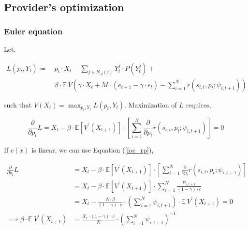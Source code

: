 \documentclass[american]{scrartcl}
\newcommand{\E}{\mathbb{E}}
\begin{document}
\subsection{Provider's optimization}

\subsubsection{Euler equation}

Let,

\begin{equation}
	\begin{split}
		L(p_t, Y_t) \coloneqq \ &p_t \cdot X_t - \sum_{j \in N_{\mathcal{A}}(i)} Y^j_t \cdot P(Y^j_t) + \\
		&\beta \cdot \E \ V\left(\gamma \cdot X_t + M \cdot \left( e_{t+1} - \gamma \cdot e_t \right) - \sum^N_{i = 1}  r(s_{i, t}, p_{t}; \psi_{i, t+1}) \right)
	\end{split}
\end{equation}

such that $V(X_t) = \max_{p_t, Y_t} L(p_t, Y_t)$. Maximization of $L$ requires,

\begin{equation}
	\frac{\partial}{\partial p_t} L = X_t - \beta \cdot \E \left[V^\prime (X_{t+1}) \right] \cdot \left[ \sum^N_{i = 1}  \frac{\partial}{\partial p_t} r(s_{i, t}, p_{t}; \psi_{i, t+1}) \right] = 0
\end{equation}

If $c(x)$ is linear, we can use Equation (\ref{foc_rp}),

\begin{equation}
	\begin{split}
		\frac{\partial}{\partial p_t} L &= X_t - \beta \cdot \E \left[V^\prime (X_{t+1}) \right] \cdot \left[ \sum^N_{i = 1}  \frac{\partial}{\partial p_t} r(s_{i, t}, p_{t}; \psi_{i, t+1}) \right] \\
		&= X_t - \beta \cdot \E \left[V^\prime (X_{t+1}) \right] \cdot \sum^N_{i = 1} \frac{\psi_{i, t+1}}{(1-\gamma) \cdot c} \\
		&= X_t - \frac{N \cdot \beta}{(1-\gamma) \cdot c} \cdot \left(\sum^N_{i = 1} \psi_{i, t+1} \right) \cdot \E \ V^\prime (X_{t+1}) = 0 \\
		\implies \beta \cdot \E \ V^\prime (X_{t+1}) &= \frac{X_t \cdot (1-\gamma) \cdot c}{N}\cdot \left(\sum^N_{i = 1} \psi_{i, t+1} \right)^{-1}
	\end{split}
\end{equation}
\end{document}
